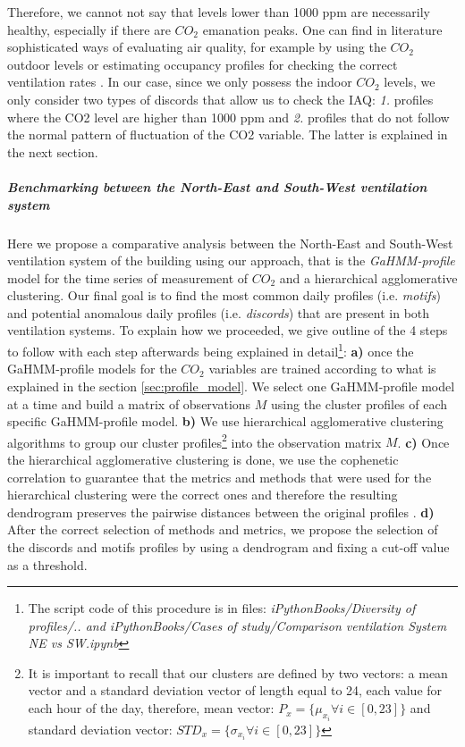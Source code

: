 Therefore, we cannot not say that levels lower than 1000 ppm are necessarily healthy, especially if there are $CO_2$ emanation peaks. One can find in literature sophisticated ways of evaluating air quality, for example by using the $CO_2$ outdoor levels \cite{persily1997evaluating} or estimating occupancy profiles for checking the correct ventilation rates \cite{batterman2017review}. In our case, since we only possess the indoor $CO_2$ levels, we only consider two types of discords that allow us to check the IAQ: \textit{1.} profiles where the CO2 level are higher than 1000 ppm and \textit{2.} profiles that do not follow the normal pattern of fluctuation of the CO2 variable. The latter is explained in the next section.

\subparagraph{\textit{Benchmarking between the North-East and South-West ventilation system}} 
\label{sec:discord_finding}


Here we propose a comparative analysis between the North-East and South-West ventilation system of the building using our approach, that is the \textit{GaHMM-profile} model for the time series of measurement of $CO_2$ and a hierarchical agglomerative clustering. Our final goal is to find the most common daily profiles (i.e. \textit{motifs}) and potential anomalous daily profiles (i.e. \textit{discords}) that are present in both ventilation systems. To explain how we proceeded, we give outline of the 4 steps to follow with each step afterwards being explained in detail\footnote{The script code of this procedure is in files: \textit{ iPythonBooks/Diversity of profiles/.. and  iPythonBooks/Cases of study/Comparison ventilation System NE vs SW.ipynb}}: \textbf{a)} once the GaHMM-profile models for the $CO_2$ variables are trained according to what is explained in the section \ref{sec:profile_model}. We select one GaHMM-profile model at a time and build a matrix of observations $M$ using the cluster profiles of each specific GaHMM-profile model. \textbf{ b)} We use hierarchical agglomerative clustering algorithms \cite{mullner2011modern} to group our cluster profiles\footnote{It is important to recall that our clusters are defined by two vectors: a mean vector and a standard deviation vector of length equal to 24, each value for each hour of the day, therefore, mean vector: $P_x = \{ \mu_{x_i} \forall i \in [0,23] \}$  and standard deviation vector: $STD_x = \{ \sigma_{x_i} \forall i \in [0,23] \}$} into the observation matrix $M$. \textbf{c)} Once the hierarchical agglomerative clustering is done, we use the cophenetic correlation \cite{saraccli2013comparison} to guarantee that the metrics and methods that were used for the hierarchical clustering were the correct ones and therefore the resulting dendrogram preserves the pairwise distances between the original profiles \cite{saraccli2013comparison}. \textbf{d)} After the correct selection of methods and metrics, we propose the selection of the discords and motifs profiles by using a dendrogram and fixing a cut-off value as a threshold. \\

